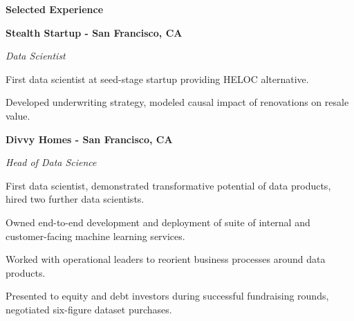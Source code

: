 \documentclass{res}
\begin{document}
{\begin{resume}
\begin{minipage}{7.6in}
\vspace{8mm}
\hrulefill\textbf{\hspace{2mm}Selected Experience\hspace{2mm}}\hrulefill
\vspace{2.5mm}




\textbf{Stealth Startup - San Francisco, CA}

\vspace{0.75mm}
{\it Data Scientist}  
\vspace{0.5mm}
\begin{list}{}{\leftmargin=1em}\itemsep-2pt
\item First data scientist at seed-stage startup providing HELOC alternative.
\item Developed underwriting strategy, modeled causal impact of renovations on resale value.
\end{list}

\vspace{3mm}
\textbf{Divvy Homes - San Francisco, CA}

\vspace{0.75mm}
{\it Head of Data Science}  
\vspace{0.5mm}
\begin{list}{}{\leftmargin=1em}\itemsep-2pt
\item First data scientist, demonstrated transformative potential of data products, hired two further data scientists.
\item Owned end-to-end development and deployment of suite of internal and customer-facing machine learning services.
\item Worked with operational leaders to reorient business processes around data products.
\item Presented to equity and debt investors during successful fundraising rounds, negotiated six-figure dataset purchases.
\end{list}


\end{minipage}
\end{resume}}
\end{document}
